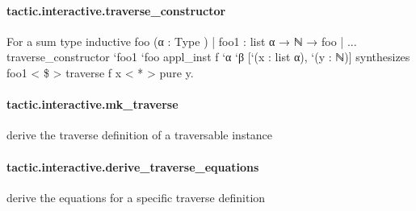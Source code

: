 \documentclass{article}
\begin{document}
\paragraph{tactic.interactive.traverse\_constructor}
\par
For a sum type 
\colorbox[RGB]{253,246,227}{{{{\color[RGB]{133, 153, 0} inductive }}}{{{\color[RGB]{101, 123, 131}   }}}{{{\color[RGB]{211, 54, 130} foo }}}{{{\color[RGB]{101, 123, 131}   }}}{{{\color[RGB]{101, 123, 131} (α :  }}}{{{\color[RGB]{38, 139, 210} Type }}}{{{\color[RGB]{101, 123, 131} ) | foo1 : list α  }}}{{{\color[RGB]{133, 153, 0} → }}}{{{\color[RGB]{101, 123, 131}  ℕ  }}}{{{\color[RGB]{133, 153, 0} → }}}{{{\color[RGB]{101, 123, 131}  foo | ... }}}}\colorbox[RGB]{253,246,227}{{{{\color[RGB]{101, 123, 131} traverse\_constructor `foo1 `foo appl\_inst f `α `β {[}`(x : list α), `(y : ℕ){]} }}}}synthesizes 
\colorbox[RGB]{253,246,227}{{{{\color[RGB]{101, 123, 131} foo1  }}}{{{\color[RGB]{181, 137, 0} < }}}{{{\color[RGB]{101, 123, 131} \$ }}}{{{\color[RGB]{181, 137, 0} > }}}{{{\color[RGB]{101, 123, 131}  traverse f x  }}}{{{\color[RGB]{181, 137, 0} < }}}{{{\color[RGB]{181, 137, 0} * }}}{{{\color[RGB]{181, 137, 0} > }}}{{{\color[RGB]{101, 123, 131}  pure y. }}}}\paragraph{tactic.interactive.mk\_traverse}
\par
derive the 
\colorbox[RGB]{253,246,227}{{{{\color[RGB]{101, 123, 131} traverse }}}} definition of a 
\colorbox[RGB]{253,246,227}{{{{\color[RGB]{101, 123, 131} traversable }}}} instance
\paragraph{tactic.interactive.derive\_traverse\_equations}
\par
derive the equations for a specific 
\colorbox[RGB]{253,246,227}{{{{\color[RGB]{101, 123, 131} traverse }}}} definition
\end{document}

